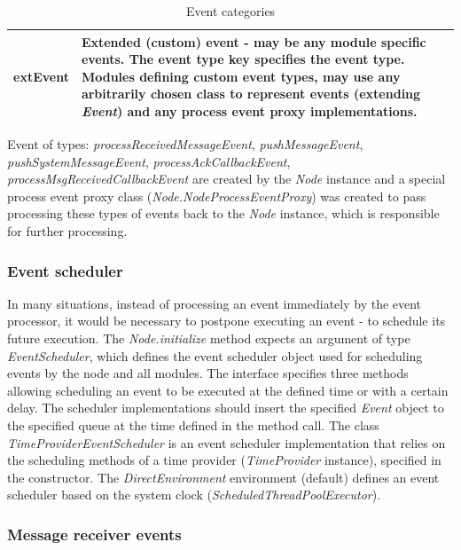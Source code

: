 \begin{table}
\begin{center}
\begin{tabular}{p{5.0cm} p{9.5cm}}
	\textbf{extEvent}							& Extended (custom) event - may be any module specific events. The event type key specifies the event type. Modules defining custom event types, may use any arbitrarily chosen class to represent events (extending \emph{Event}) and any process event proxy implementations.		\\[1.5mm]	
    \hline
\end{tabular}
\end{center}
\caption{Event categories}
\label{tab:libEventCategory}
\end{table}

Event of types: \emph{processReceivedMessageEvent}, \emph{pushMessageEvent}, \emph{pushSystemMessageEvent}, \emph{processAckCallbackEvent}, \emph{processMsgReceivedCallbackEvent} are created by the \emph{Node} instance and a special process event proxy class (\emph{Node.NodeProcessEventProxy}) was created to pass processing these types of events back to the \emph{Node} instance, which is responsible for further processing.



\subsubsection{Event scheduler}

In many situations, instead of processing an event immediately by the event processor, it would be necessary to postpone executing an event - to schedule its future execution. The \emph{Node.initialize} method expects an argument of type \emph{EventScheduler}, which defines the event scheduler object used for scheduling events by the node and all modules. The interface specifies three methods allowing scheduling an event to be executed at the defined time or with a certain delay. The scheduler implementations should insert the specified \emph{Event} object to the specified queue at the time defined in the method call. The class \emph{TimeProviderEventScheduler} is an event scheduler implementation that relies on the scheduling methods of a time provider (\emph{TimeProvider} instance), specified in the constructor. The \emph{DirectEnvironment} environment (default) defines an event scheduler based on the system clock (\emph{ScheduledThreadPoolExecutor}).



\subsubsection{Message receiver events}

